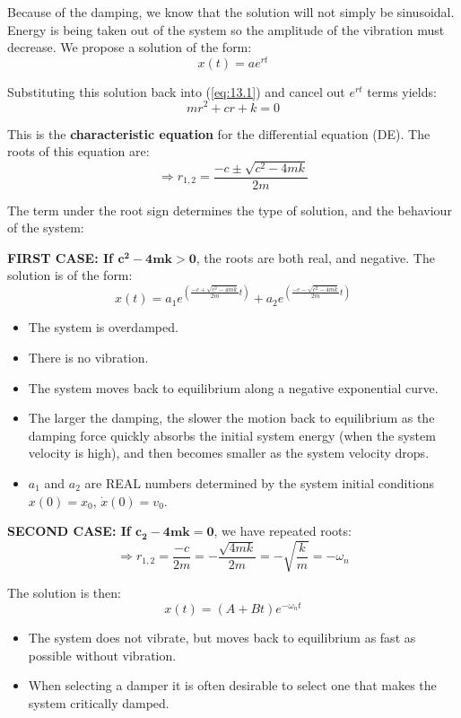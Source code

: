 \documentclass[12pt,letterpaper,twoside]{report}
\begin{document}
Because of the damping, we know that the solution will not simply be sinusoidal.  Energy is being taken out of the system so the amplitude of the vibration must decrease.  We propose a solution of the form:
\[
x(t) = ae^{rt}
\]

Substituting this solution back into (\ref{eq:13.1}) and cancel out $e^{rt}$ terms yields:
\[
mr^2 + cr+k=0
\]

This is the \textbf{characteristic equation} for the differential equation (DE).  The roots of this equation are:
\[
\Rightarrow \displaystyle r_{1,2} = \frac{-c \pm \sqrt{c^2 - 4mk}}{2m}
\]

The term under the root sign determines the type of solution, and the behaviour of the system:


\textbf{FIRST CASE: If $\bm{c^2 - 4mk>0}$}, the roots are both real, and negative.  The solution is of the form:
\[
\displaystyle x(t) = a_1 e^{ \left( \frac{-c + \sqrt{c^2 - 4mk}}{2m}t \right)} + a_2 e^{ \left( \frac{-c -\sqrt{c^2 - 4mk}}{2m} t \right)}
\]

\begin{itemize}
\item The system is overdamped.
\item There is no vibration.  
\item The system moves back to equilibrium along a negative exponential curve.  
\item The larger the damping, the slower the motion back to equilibrium as the damping force quickly absorbs the initial system energy (when the system velocity is high), and then becomes smaller as the system velocity drops.  
\item $a_1$ and $a_2$ are REAL numbers determined by the system initial conditions $x(0) = x_0$, $\dot{x}(0) = v_0$.
\end{itemize}

\vspace*{20\baselineskip}

\textbf{SECOND CASE: If $\bm{c_2 - 4mk=0}$}, we have repeated roots:
\[
\Rightarrow r_{1,2} = \frac{-c}{2m} = - \frac{\sqrt{4mk}}{2m} = -\sqrt{\frac{k}{m}} = - \omega_n
\]

The solution is then:
\[
x(t) = (A + Bt) e^{-\omega_n t}
\]
\begin{itemize}
\item The system does not vibrate, but moves back to equilibrium as fast as possible without vibration.  
\item When selecting a damper it is often desirable to select one that makes the system critically damped.  
\end{itemize}
\end{document}
